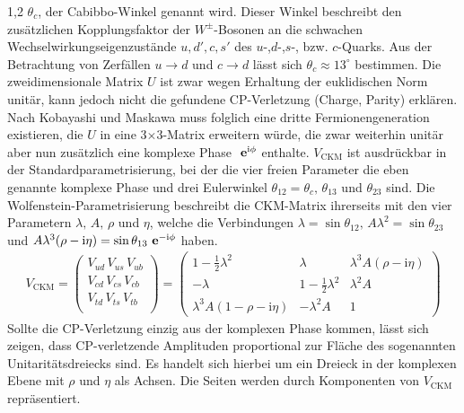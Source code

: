 \documentclass[11pt,a4paper,twoside]{report}
\begin{document}
\begin{spacing}{1,2}
$\theta_c$, der Cabibbo-Winkel genannt wird. Dieser Winkel beschreibt den zusätzlichen Kopplungsfaktor der $W^\pm$-Bosonen an die schwachen 
Wechselwirkungseigenzustände $u, d', c, s'$ des $u$-,$d$-,$s$-, bzw. $c$-Quarks. Aus der Betrachtung von Zerfällen $u\rightarrow d$ und $c\rightarrow d$ lässt
sich $\theta_c \approx 13^\circ$ bestimmen. Die zweidimensionale Matrix $U$ ist zwar wegen Erhaltung der euklidischen Norm unitär, kann jedoch nicht die 
gefundene CP-Verletzung (Charge, Parity) erklären. Nach Kobayashi und Maskawa muss folglich eine dritte Fermionengeneration existieren,
die $U$ in eine 3$\times$3-Matrix erweitern würde, die zwar weiterhin unitär aber nun zusätzlich eine komplexe Phase $\ \mathbf{e}^{\text{i}\phi}$ enthalte. $V_{\text{CKM}}$ ist
ausdrückbar in der Standardparametrisierung, bei der die vier freien Parameter die eben genannte komplexe Phase und drei Eulerwinkel 
$\theta_{12} = \theta_c,\, \theta_{13}$ und $\theta_{23}$ sind. Die Wolfenstein-Parametrisierung beschreibt die CKM-Matrix ihrerseits mit den vier Parametern
$\lambda,\, A,\, \rho$ und $\eta$, welche die Verbindungen $\lambda = \sin\theta_{12},\, A\lambda^2 = \sin\theta_{23}$ und $A\lambda^3(\rho-\text{i}\eta) = \sin\theta_{13}\ \mathbf{e}^{-\text{i}\phi}$
haben.
\begin{align}
 V_{\text{CKM}} = \begin{pmatrix}
            V_{ud}\,V_{us}\,V_{ub}\\
            V_{cd}\,V_{cs}\,V_{cb}\\
            V_{td}\,V_{ts}\,V_{tb}\\
           \end{pmatrix} = \begin{pmatrix}
			    1-\frac12\lambda^2 & \lambda & \lambda^3A(\rho-\text{i}\eta)\\
			    -\lambda & 1-\frac12 \lambda^2 &\lambda^2A\\
			    \lambda^3A(1-\rho-\text{i}\eta) &-\lambda^2A & 1
			    \end{pmatrix}
\end{align}
Sollte die CP-Verletzung einzig aus der komplexen Phase kommen, lässt sich zeigen, dass CP-verletzende Amplituden proportional zur Fläche des sogenannten
Unitaritätsdreiecks sind. Es handelt sich hierbei um ein Dreieck in der komplexen Ebene mit $\rho$ und $\eta$ als Achsen. Die Seiten werden durch Komponenten
von $V_{\text{CKM}}$ repräsentiert.


\end{spacing}
\end{document}
